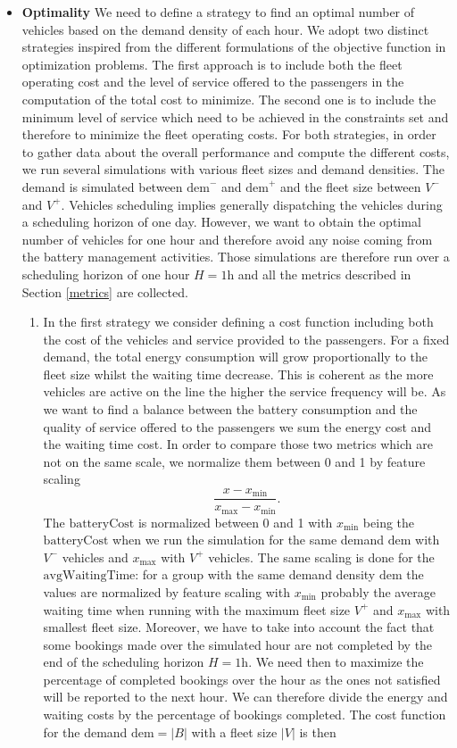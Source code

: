 \documentclass[12pt,a4paper]{article}
\begin{document}
\begin{itemize}
\item \textbf{Optimality} We need to define a strategy to find an optimal number of vehicles based on the demand density of each hour. We adopt two distinct strategies inspired from the different formulations of the objective function in optimization problems. The first approach is to include both the fleet operating cost and the level of service offered to the passengers in the computation of the total cost to minimize. The second one is to include the minimum level of service which need to be achieved in the constraints set and therefore to minimize the fleet operating costs. For both strategies, in order to gather data about the overall performance and compute the different costs, we run several simulations with various fleet sizes and demand densities. The demand is simulated between $\text{dem}^{-}$ and $\text{dem}^{+}$ and the fleet size between $V^{-}$ and $V^{+}$. Vehicles scheduling implies generally dispatching the vehicles during a scheduling horizon of one day. However, we want to obtain the optimal number of vehicles for one hour and therefore avoid any noise coming from the battery management activities. Those simulations are therefore run over a scheduling horizon of one hour $H = 1$h and all the metrics described in Section \ref{metrics} are collected. 
\begin{enumerate}
\setlength\itemsep{1pt} 
\item In the first strategy we consider defining a cost function including both the cost of the vehicles and service provided to the passengers. For a fixed demand, the total energy consumption will grow proportionally to the fleet size whilst the waiting time decrease. This is coherent as the more vehicles are active on the line the higher the service frequency will be. As we want to find a balance between the battery consumption and the quality of service offered to the passengers we sum the energy cost and the waiting time cost. In order to compare those two metrics which are not on the same scale, we normalize them between 0 and 1 by feature scaling $$\frac{x-x_{\min}}{x_{\max}-x_{\min}}.$$ The $\text{batteryCost}$ is normalized between 0 and 1 with $x_{\min}$ being the $\text{batteryCost}$ when we run the simulation for the same demand $\text{dem}$ with $V^{-}$ vehicles and $x_{\max}$ with $V^{+}$ vehicles. The same scaling is done for the $\text{avgWaitingTime}$: for a group with the same demand density $\text{dem}$ the values are normalized by feature scaling with $x_{\min}$ probably the average waiting time when running with the maximum fleet size  $V^{+}$ and $x_{\max}$ with smallest fleet size. Moreover, we have to take into account the fact that some bookings made over the simulated hour are not completed by the end of the scheduling horizon $H=1\text{h}$. We need then to maximize the percentage of completed bookings over the hour as the ones not satisfied will be reported to the next hour. We can therefore divide the energy and waiting costs by the percentage of bookings completed. The cost function for the demand $\text{dem} = |B|$ with a fleet size $|V|$ is then


\end{enumerate}
\end{itemize}
\end{document}
